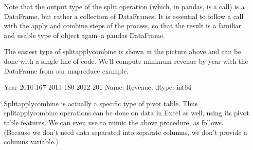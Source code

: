 \documentclass[letterpaper,10pt,english]{sphinxmanual}
\begin{document}
Note that the output type of the split operation (which, in pandas, is a  call) is  a DataFrame, but rather a collection of DataFrames.  It is essential to follow a  call with the apply and combine steps of the process, so that the result is a familiar and usable type of object again–a pandas DataFrame.

The easiest type of split\sphinxhyphen{}apply\sphinxhyphen{}combine is shown in the picture above and can be done with a single line of code.  We’ll compute minimum revenue by year with the DataFrame from our map\sphinxhyphen{}reduce example.

\begin{sphinxVerbatim}[commandchars=\\\{\}]
\PYG{p}{[}\PYG{p}{]}
\end{sphinxVerbatim}

\begin{sphinxVerbatim}[commandchars=\\\{\}]
Year
2010    167
2011    180
2012    201
Name: Revenue, dtype: int64
\end{sphinxVerbatim}

Split\sphinxhyphen{}apply\sphinxhyphen{}combine is actually a specific type of pivot table.  Thus split\sphinxhyphen{}apply\sphinxhyphen{}combine operations can be done on data in Excel as well, using its pivot table features.  We can even use  to mimic the above procedure, as follows.  (Because we don’t need data separated into separate columns, we don’t provide a columns variable.)

\begin{sphinxVerbatim}[commandchars=\\\{\}]
 \PYG{p}{[}\PYG{p}{]} \PYG{p}{[}\PYG{p}{]}   
\end{sphinxVerbatim}
\end{document}
